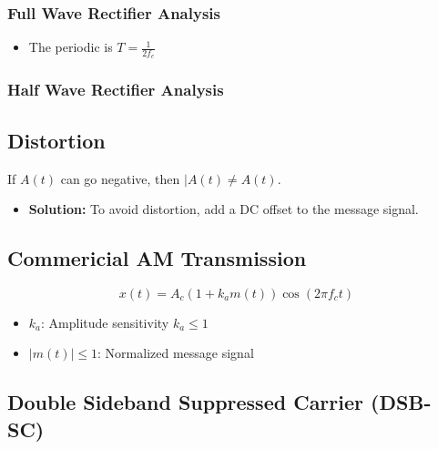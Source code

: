 \subsubsection{Full Wave Rectifier Analysis}
\begin{derivation}
    \begin{itemize}
        \item The periodic is $T=\frac{1}{2f_c}$
    \end{itemize}
\end{derivation}

\subsubsection{Half Wave Rectifier Analysis}
\begin{derivation}
\end{derivation}

\subsection{Distortion}
\begin{definition}
    If $A(t)$ can go negative, then $|A(t) \neq A(t)$.
    \begin{itemize}
        \item \textbf{Solution:} To avoid distortion, add a DC offset to the message signal. 
    \end{itemize}
\end{definition}

\subsection{Commericial AM Transmission}
\begin{definition}
    \begin{equation*}
        x(t) = A_c \left(1 + k_a m(t)\right) \cos(2 \pi f_c t)
    \end{equation*}
    \begin{itemize}
        \item $k_a$: Amplitude sensitivity $k_a \leq 1$
        \item $|m(t)| \leq 1$: Normalized message signal
    \end{itemize}

\end{definition}

\subsection{Double Sideband Suppressed Carrier (DSB-SC)}
\begin{definition}
\end{definition}

